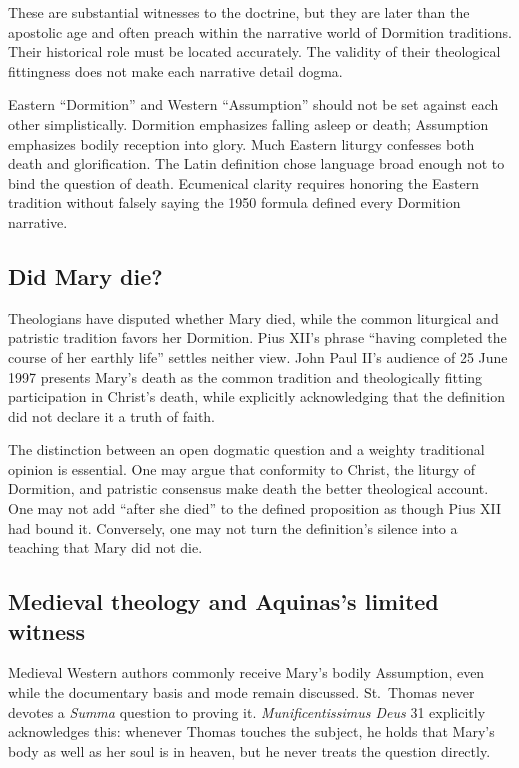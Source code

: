 These are substantial witnesses to the doctrine, but they are later than the apostolic age and often preach within the narrative world of Dormition traditions. Their historical role must be located accurately. The validity of their theological fittingness does not make each narrative detail dogma.

Eastern ``Dormition'' and Western ``Assumption'' should not be set against each other simplistically. Dormition emphasizes falling asleep or death; Assumption emphasizes bodily reception into glory. Much Eastern liturgy confesses both death and glorification. The Latin definition chose language broad enough not to bind the question of death. Ecumenical clarity requires honoring the Eastern tradition without falsely saying the 1950 formula defined every Dormition narrative.

\subsection{Did Mary die?}

Theologians have disputed whether Mary died, while the common liturgical and patristic tradition favors her Dormition. Pius XII's phrase ``having completed the course of her earthly life'' settles neither view. John Paul II's audience of 25 June 1997 presents Mary's death as the common tradition and theologically fitting participation in Christ's death, while explicitly acknowledging that the definition did not declare it a truth of faith.

The distinction between an open dogmatic question and a weighty traditional opinion is essential. One may argue that conformity to Christ, the liturgy of Dormition, and patristic consensus make death the better theological account. One may not add ``after she died'' to the defined proposition as though Pius XII had bound it. Conversely, one may not turn the definition's silence into a teaching that Mary did not die.

\subsection{Medieval theology and Aquinas's limited witness}

Medieval Western authors commonly receive Mary's bodily Assumption, even while the documentary basis and mode remain discussed. St.~Thomas never devotes a \emph{Summa} question to proving it. \emph{Munificentissimus Deus} 31 explicitly acknowledges this: whenever Thomas touches the subject, he holds that Mary's body as well as her soul is in heaven, but he never treats the question directly.

